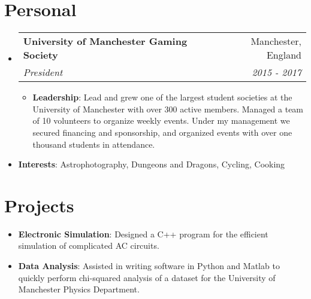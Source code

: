 \documentclass[letterpaper,11pt]{article}
\makeatletter
\newcommand{\resumeItem}[2]{
  \item\small{
    \textbf{#1}{: #2 \vspace{-2pt}}
  }
}
\newcommand{\resumeSubheading}[4]{
  \vspace{-1pt}\item
    \begin{tabular*}{0.97\textwidth}{l@{\extracolsep{\fill}}r}
      \textbf{#1} & #2 \\
      \textit{\small#3} & \textit{\small #4} \\
    \end{tabular*}\vspace{-5pt}
}
\newcommand{\resumeSubItem}[2]{\resumeItem{#1}{#2}\vspace{-4pt}}
\newcommand{\resumeSubHeadingListStart}{\begin{itemize}[leftmargin=*]}
\newcommand{\resumeSubHeadingListEnd}{\end{itemize}}
\newcommand{\resumeItemListStart}{\begin{itemize}}
\newcommand{\resumeItemListEnd}{\end{itemize}\vspace{-5pt}}
\makeatother
\begin{document}
\section{Personal}
  \resumeSubHeadingListStart

    \resumeSubheading
    {University of Manchester Gaming Society}{Manchester, England}
    {President}{2015 - 2017}
    \resumeItemListStart
      \resumeItem{Leadership}
        {Lead and grew one of the largest student societies at the University of Manchester with over 300 active
        members. Managed a team of 10 volunteers to organize weekly events. Under my management we secured financing
        and sponsorship, and organized events with over one thousand students in attendance.}
    \resumeItemListEnd

    \item{
      \textbf{Interests}{: Astrophotography, Dungeons and Dragons, Cycling, Cooking}
    }

  \resumeSubHeadingListEnd


\section{Projects}
  \resumeSubHeadingListStart
    \resumeSubItem{Electronic Simulation}
      {Designed a C++ program for the efficient simulation of complicated AC circuits.}
    \resumeSubItem{Data Analysis}
      {Assisted in writing software in Python and Matlab to quickly perform chi-squared analysis of a
      dataset for the University of Manchester Physics Department.}
  \resumeSubHeadingListEnd



\end{document}
